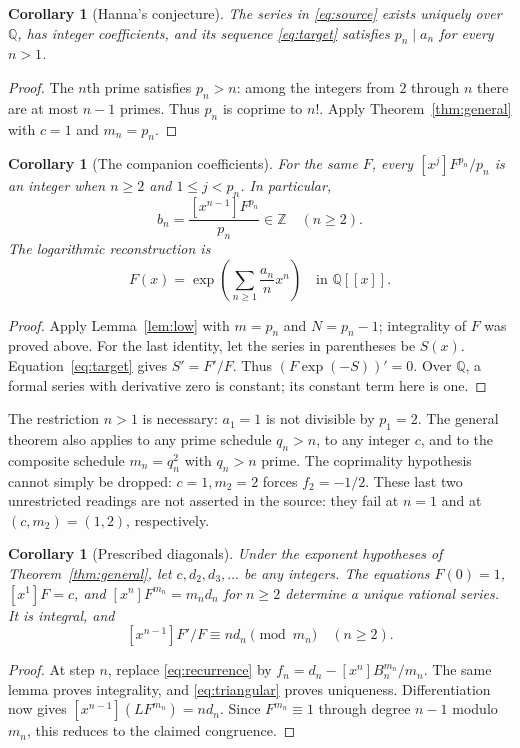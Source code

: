 \documentclass[11pt]{article}
\newtheorem{corollary}[theorem]{Corollary}
\newcommand{\coeff}[1]{[x^{#1}]}
\begin{document}
\begin{corollary}[Hanna's conjecture]\label{cor:hanna}
The series in \eqref{eq:source} exists uniquely over $\mathbb Q$, has
integer coefficients, and its sequence \eqref{eq:target} satisfies
$p_n\mid a_n$ for every $n>1$.
\end{corollary}
\begin{proof}
The $n$th prime satisfies $p_n>n$: among the integers from $2$ through
$n$ there are at most $n-1$ primes. Thus $p_n$ is coprime to $n!$.
Apply Theorem~\ref{thm:general} with $c=1$ and $m_n=p_n$.
\end{proof}

\begin{corollary}[The companion coefficients]\label{cor:sibling}
For the same $F$, every $\coeff jF^{p_n}/p_n$ is an integer when
$n\ge2$ and $1\le j<p_n$. In particular,
\[
 b_n=\frac{\coeff{n-1}F^{p_n}}{p_n}\in\mathbb Z\quad(n\ge2).
\]
The logarithmic reconstruction is
\[
 F(x)=\exp\left(\sum_{n\ge1}\frac{a_n}{n}x^n\right)
 \quad\text{in }\mathbb Q[[x]].
\]
\end{corollary}
\begin{proof}
Apply Lemma~\ref{lem:low} with $m=p_n$ and $N=p_n-1$; integrality of
$F$ was proved above. For the last identity, let the series in parentheses
be $S(x)$. Equation~\eqref{eq:target} gives $S'=F'/F$.
Thus $(F\exp(-S))'=0$. Over $\mathbb Q$, a formal series with derivative
zero is constant; its constant term here is one.
\end{proof}

The restriction $n>1$ is necessary: $a_1=1$ is not divisible by $p_1=2$.
The general theorem also applies to any prime schedule $q_n>n$, to any
integer $c$, and to the composite schedule $m_n=q_n^2$ with $q_n>n$ prime.
The coprimality hypothesis cannot simply be dropped: $c=1,m_2=2$
forces $f_2=-1/2$.
These last two unrestricted readings are not asserted in the source:
they fail at $n=1$ and at $(c,m_2)=(1,2)$, respectively.

\begin{corollary}[Prescribed diagonals]\label{cor:diagonal}
Under the exponent hypotheses of Theorem~\ref{thm:general}, let
$c,d_2,d_3,\ldots$ be any integers. The equations
$F(0)=1$, $\coeff1F=c$, and
$\coeff nF^{m_n}=m_nd_n$ for $n\ge2$ determine a unique rational
series. It is integral, and
\[
 \coeff{n-1}F'/F\equiv nd_n\pmod {m_n}\quad(n\ge2).
\]
\end{corollary}
\begin{proof}
At step $n$, replace \eqref{eq:recurrence} by
$f_n=d_n-\coeff n B_n^{m_n}/m_n$. The same lemma proves integrality,
and \eqref{eq:triangular} proves uniqueness. Differentiation now gives
$\coeff{n-1}(LF^{m_n})=nd_n$. Since $F^{m_n}\equiv1$ through
degree $n-1$ modulo $m_n$, this reduces to the claimed congruence.
\end{proof}
\end{document}
